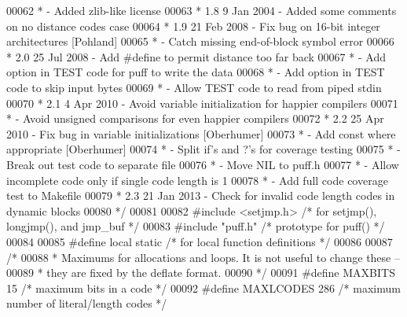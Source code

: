 \begin{DoxyCode}
00062 \textcolor{comment}{ *                      - Added zlib-like license}
00063 \textcolor{comment}{ * 1.8   9 Jan 2004     - Added some comments on no distance codes case}
00064 \textcolor{comment}{ * 1.9  21 Feb 2008     - Fix bug on 16-bit integer architectures [Pohland]}
00065 \textcolor{comment}{ *                      - Catch missing end-of-block symbol error}
00066 \textcolor{comment}{ * 2.0  25 Jul 2008     - Add #define to permit distance too far back}
00067 \textcolor{comment}{ *                      - Add option in TEST code for puff to write the data}
00068 \textcolor{comment}{ *                      - Add option in TEST code to skip input bytes}
00069 \textcolor{comment}{ *                      - Allow TEST code to read from piped stdin}
00070 \textcolor{comment}{ * 2.1   4 Apr 2010     - Avoid variable initialization for happier compilers}
00071 \textcolor{comment}{ *                      - Avoid unsigned comparisons for even happier compilers}
00072 \textcolor{comment}{ * 2.2  25 Apr 2010     - Fix bug in variable initializations [Oberhumer]}
00073 \textcolor{comment}{ *                      - Add const where appropriate [Oberhumer]}
00074 \textcolor{comment}{ *                      - Split if's and ?'s for coverage testing}
00075 \textcolor{comment}{ *                      - Break out test code to separate file}
00076 \textcolor{comment}{ *                      - Move NIL to puff.h}
00077 \textcolor{comment}{ *                      - Allow incomplete code only if single code length is 1}
00078 \textcolor{comment}{ *                      - Add full code coverage test to Makefile}
00079 \textcolor{comment}{ * 2.3  21 Jan 2013     - Check for invalid code length codes in dynamic blocks}
00080 \textcolor{comment}{ */}
00081 
00082 \textcolor{preprocessor}{#include <setjmp.h>}             \textcolor{comment}{/* for setjmp(), longjmp(), and jmp\_buf */}
00083 \textcolor{preprocessor}{#include "puff.h"}               \textcolor{comment}{/* prototype for puff() */}
00084 
00085 \textcolor{preprocessor}{#define local static            }\textcolor{comment}{/* for local function definitions */}\textcolor{preprocessor}{}
00086 
00087 \textcolor{comment}{/*}
00088 \textcolor{comment}{ * Maximums for allocations and loops.  It is not useful to change these --}
00089 \textcolor{comment}{ * they are fixed by the deflate format.}
00090 \textcolor{comment}{ */}
00091 \textcolor{preprocessor}{#define MAXBITS 15              }\textcolor{comment}{/* maximum bits in a code */}\textcolor{preprocessor}{}
00092 \textcolor{preprocessor}{#define MAXLCODES 286           }\textcolor{comment}{/* maximum number of literal/length codes */}\textcolor{preprocessor}{}

\end{DoxyCode}
